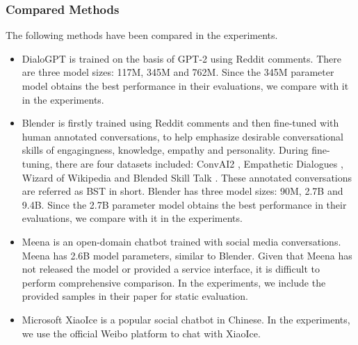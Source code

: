 \documentclass[11pt,a4paper]{article}
\begin{document}
	\subsubsection{Compared Methods}
	The following methods have been compared in the experiments.
	\begin{itemize}[leftmargin=*,noitemsep,topsep=0pt]
		\item DialoGPT \cite{zhang2019dialogpt} is trained on the basis of GPT-2 \cite{radford2019language} using Reddit comments. There are three model sizes: 117M, 345M and 762M. Since the 345M parameter model obtains the best performance in their evaluations, we compare with it in the experiments.
		
		\item Blender \cite{roller2020recipes} is firstly trained using Reddit comments and then fine-tuned with human annotated conversations, to help emphasize desirable conversational skills of engagingness, knowledge, empathy and personality. During fine-tuning, there are four datasets included: ConvAI2 \cite{zhang2018personalizing,dinan2020second}, Empathetic Dialogues \cite{rashkin2019towards}, Wizard of Wikipedia \cite{dinan2019wizard} and Blended Skill Talk \cite{smith2020can}. These annotated conversations are referred as BST in short. Blender has three model sizes: 90M, 2.7B and 9.4B. Since the 2.7B parameter model obtains the best performance in their evaluations, we compare with it in the experiments.
		
		\item Meena \cite{adiwardana2020towards} is an open-domain chatbot trained with social media conversations. Meena has 2.6B model parameters, similar to Blender. Given that Meena has not released the model or provided a service interface, it is difficult to perform comprehensive comparison. In the experiments, we include the provided samples in their paper for static evaluation.
		
		\item Microsoft XiaoIce \cite{zhou2020design} is a popular social chatbot in Chinese. In the experiments, we use the official Weibo platform to chat with XiaoIce.
	\end{itemize}
	
\end{document}
